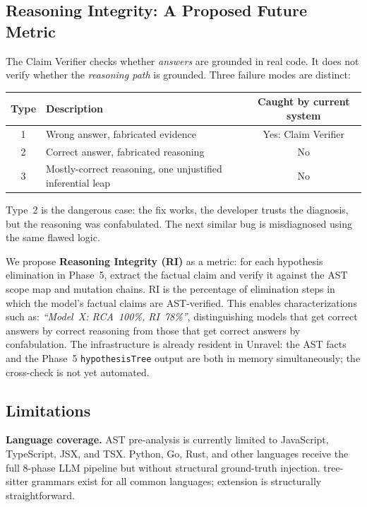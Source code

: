 \documentclass[12pt,a4paper]{article}
\newcommand{\code}[1]{\texttt{\small #1}}
\begin{document}
\subsection{Reasoning Integrity: A Proposed Future Metric}
\label{sec:ri}

The Claim Verifier checks whether \textit{answers} are grounded in real code. It does not
verify whether the \textit{reasoning path} is grounded. Three failure modes are distinct:

\vspace{4pt}
\begin{center}
\begin{tabular}{@{}c p{7.5cm} c@{}}
\toprule
\textbf{Type} & \textbf{Description} & \textbf{Caught by current system} \\
\midrule
1 & Wrong answer, fabricated evidence       & Yes: Claim Verifier \\
2 & Correct answer, fabricated reasoning    & No \\
3 & Mostly-correct reasoning, one unjustified inferential leap & No \\
\bottomrule
\end{tabular}
\end{center}
\vspace{4pt}

Type~2 is the dangerous case: the fix works, the developer trusts the diagnosis, but the
reasoning was confabulated. The next similar bug is misdiagnosed using the same flawed logic.

We propose \textbf{Reasoning Integrity (RI)} as a metric: for each hypothesis elimination
in Phase~5, extract the factual claim and verify it against the AST scope map and mutation
chains. RI is the percentage of elimination steps in which the model's factual claims are
AST-verified. This enables characterizations such as: \textit{``Model~X: RCA~100\%,
RI~78\%''}, distinguishing models that get correct answers by correct reasoning from those
that get correct answers by confabulation. The infrastructure is already resident in
Unravel: the AST facts and the Phase~5 \code{hypothesisTree} output are both in memory
simultaneously; the cross-check is not yet automated.

\subsection{Limitations}

\textbf{Language coverage.} AST pre-analysis is currently limited to JavaScript,
TypeScript, JSX, and TSX. Python, Go, Rust, and other languages receive the full 8-phase
LLM pipeline but without structural ground-truth injection. tree-sitter grammars exist for
all common languages; extension is structurally straightforward.
\end{document}
